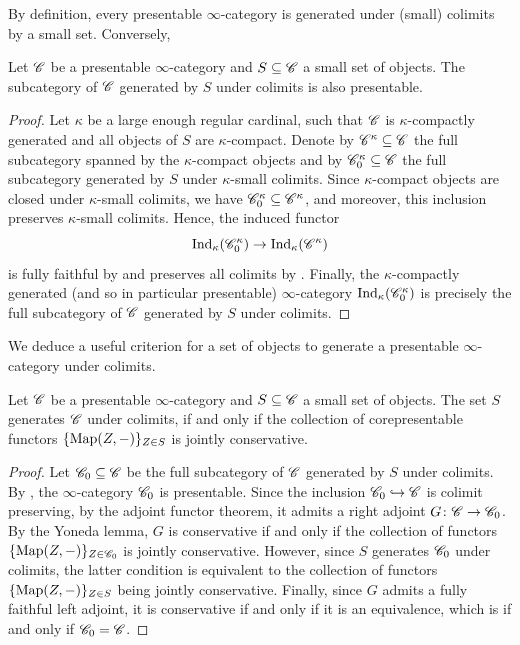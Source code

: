 \documentclass[12pt]{article}
\begin{document}
By definition, every presentable $\infty$-category is generated under (small) colimits by a small set. Conversely, 
\begin{prop}\label{Gen_Presentable}
    Let $\mathscr{C}$ be a presentable $\infty$-category and $S\subseteq \mathscr{C}$ a small set of objects. The subcategory of $\mathscr{C}$ generated by $S$ under colimits is also presentable. 
\end{prop}
\begin{proof}
    Let $\kappa$ be a large enough regular cardinal, such that $\mathscr{C}$ is $\kappa$-compactly generated and all objects of $S$ are $\kappa$-compact. Denote by $\mathscr{C}^\kappa \subseteq \mathscr{C}$ the full subcategory spanned by the $\kappa$-compact objects and by $\mathscr{C}_0^\kappa\subseteq \mathscr{C}$ the full subcategory generated by $S$ under $\kappa$-small colimits. Since $\kappa$-compact objects are closed under $\kappa$-small colimits, we have $\mathscr{C}_0^\kappa \subseteq \mathscr{C}^\kappa$, and moreover, this inclusion preserves $\kappa$-small colimits. Hence, the induced functor
    \[
        \operatorname{Ind}_\kappa(\mathscr{C}_0^\kappa) \to \operatorname{Ind}_\kappa(\mathscr{C}^\kappa)
    \]
    is fully faithful by \cite[Proposition 5.3.5.11]{htt} and preserves all colimits by \cite[Proposition 5.3.5.13]{htt}. Finally, the $\kappa$-compactly generated (and so in particular presentable) $\infty$-category $\operatorname{Ind}_\kappa(\mathscr{C}_0^\kappa)$ is precisely the full subcategory of $\mathscr{C}$ generated by $S$ under colimits.
\end{proof}

We deduce a useful criterion for a set of objects to generate a presentable $\infty$-category under colimits. 
\begin{cor}\label{Gen_Crit}
    Let $\mathscr{C}$ be a presentable $\infty$-category and $S\subseteq\mathscr{C}$ a small set of objects. The set $S$  generates $\mathscr{C}$ under colimits, if and only if the collection of corepresentable functors $\{\operatorname{Map}(Z,-)\}_{Z\in S}$ is jointly conservative.    
\end{cor}
\begin{proof}
    Let $\mathscr{C}_0 \subseteq \mathscr{C}$ be the full subcategory of $\mathscr{C}$ generated by $S$ under colimits. By , the $\infty$-category $\mathscr{C}_0$ is presentable. Since the inclusion $\mathscr{C}_0 \hookrightarrow \mathscr{C}$ is colimit preserving, by the adjoint functor theorem, it admits a right adjoint $G\colon \mathscr{C} \to \mathscr{C}_0$. By the Yoneda lemma, $G$ is conservative if and only if the collection of functors $\{\operatorname{Map}(Z,-)\}_{Z\in\mathscr{C}_0}$ is jointly conservative. However, since $S$ generates $\mathscr{C}_0$ under colimits, the latter condition is equivalent to the collection of functors $\{\operatorname{Map}(Z,-)\}_{Z\in S}$ being jointly conservative. Finally, since $G$ admits a fully faithful left adjoint, it is conservative if and only if it is an equivalence, which is if and only if $\mathscr{C}_0 = \mathscr{C}$.
\end{proof}
\end{document}

